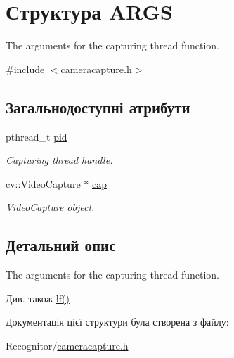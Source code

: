 \hypertarget{structARGS}{\section{Структура A\-R\-G\-S}
\label{structARGS}
}


The arguments for the capturing thread function.  




{\ttfamily \#include $<$cameracapture.\-h$>$}

\subsection*{Загальнодоступні атрибути}
\begin{DoxyCompactItemize}
\item 
\hypertarget{structARGS_af74ee694152c4be9de805a3fe7b709dc}{pthread\-\_\-t \hyperlink{structARGS_af74ee694152c4be9de805a3fe7b709dc}{pid}}\label{structARGS_af74ee694152c4be9de805a3fe7b709dc}

\begin{DoxyCompactList}\small\item\em Capturing thread handle. \end{DoxyCompactList}\item 
\hypertarget{structARGS_a6b299867eec1febb4d3ed313ac73f0d7}{cv\-::\-Video\-Capture $\ast$ \hyperlink{structARGS_a6b299867eec1febb4d3ed313ac73f0d7}{cap}}\label{structARGS_a6b299867eec1febb4d3ed313ac73f0d7}

\begin{DoxyCompactList}\small\item\em Video\-Capture object. \end{DoxyCompactList}\end{DoxyCompactItemize}


\subsection{Детальний опис}
The arguments for the capturing thread function. 

\begin{DoxySeeAlso}{Див. також}
\hyperlink{cameracapture_8cpp_a769587c2f6dfb4e80afb00bb2048cc35}{lf()} 
\end{DoxySeeAlso}


Документація цієї структури була створена з файлу\-:\begin{DoxyCompactItemize}
\item 
Recognitor/\hyperlink{cameracapture_8h}{cameracapture.\-h}\end{DoxyCompactItemize}
